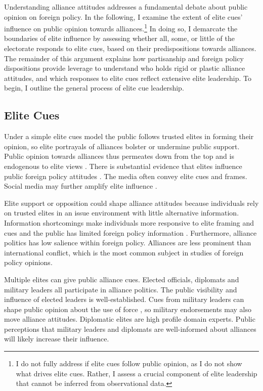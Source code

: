 \documentclass[12pt]{article}
\begin{document}
Understanding alliance attitudes addresses a fundamental debate about public opinion on foreign policy. 
In the following, I examine the extent of elite cues' influence on public opinion towards alliances.\footnote{I do not fully address if elite cues follow public opinion, as I do not show what drives elite cues. Rather, I assess a crucial component of elite leadership that cannot be inferred from observational data.}
In doing so, I demarcate the boundaries of elite influence by assessing whether all, some, or little of the electorate responds to elite cues, based on their predispositions towards alliances.
The remainder of this argument explains how partisanship and foreign policy dispositions provide leverage to understand who holds rigid or plastic alliance attitudes, and which responses to elite cues reflect extensive elite leadership. 
To begin, I outline the general process of elite cue leadership. 


\subsection{Elite Cues} 


Under a simple elite cues model the public follows trusted elites in forming their opinion, so elite portrayals of alliances bolster or undermine public support.
Public opinion towards alliances thus permeates down from the top and is endogenous to elite views \citep{Druckman2014}.
There is substantial evidence that elites influence public foreign policy attitudes \citep{BaumPotter2008}. 
The media often convey elite cues and frames.
Social media may further amplify elite influence \citep{BaumPotter2019}.   


Elite support or opposition could shape alliance attitudes because individuals rely on trusted elites in an issue environment with little alternative information. 
Information shortcomings make individuals more responsive to elite framing and cues \citep{Druckman2001, Peterson2017} and the public has limited foreign policy information \citep{BaumPotter2008}.
Furthermore, alliance politics has low salience within foreign policy. 
Alliances are less prominent than international conflict, which is the most common subject in studies of foreign policy opinions. 


Multiple elites can give public alliance cues.
Elected officials, diplomats and military leaders all participate in alliance politics.
The public visibility and influence of elected leaders is well-established.  
Cues from military leaders can shape public opinion about the use of force \citep{Golbyetal2018}, so military endorsements may also move alliance attitudes. 
Diplomatic elites are high profile domain experts. 
Public perceptions that military leaders and diplomats are well-informed about alliances will likely increase their influence. 
\end{document}
